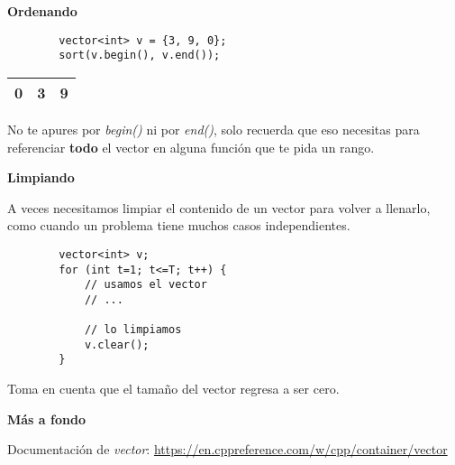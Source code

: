 \documentclass[10pt]{beamer}
\begin{document}
\begin{frame}{}
  \framebreak
  \textbf{Ordenando}
      \begin{verbatim}
        vector<int> v = {3, 9, 0};
        sort(v.begin(), v.end());
    \end{verbatim}
    
    \begin{center}
    \begin{tabular}{ |c|c|c| } 
      \hline
      0 & 3 & 9  \\
      \hline
    \end{tabular}
  \end{center}
    No te apures por \textit{begin()} ni por \textit{end()}, solo recuerda que eso necesitas para referenciar \textbf{todo} el vector en alguna función que te pida un rango.
  
  \framebreak
  
  \textbf{Limpiando}
  
  A veces necesitamos limpiar el contenido de un vector para volver a llenarlo, como cuando un problema tiene muchos casos independientes. 
      \begin{verbatim}
        vector<int> v;
        for (int t=1; t<=T; t++) {
            // usamos el vector
            // ...
            
            // lo limpiamos
            v.clear();
        }
    \end{verbatim}
    
    Toma en cuenta que el tamaño del vector regresa a ser cero.

  \framebreak
  
  \textbf{Más a fondo}
  
  Documentación de \textit{vector}: \url{https://en.cppreference.com/w/cpp/container/vector}
 
\end{frame}
\end{document}
